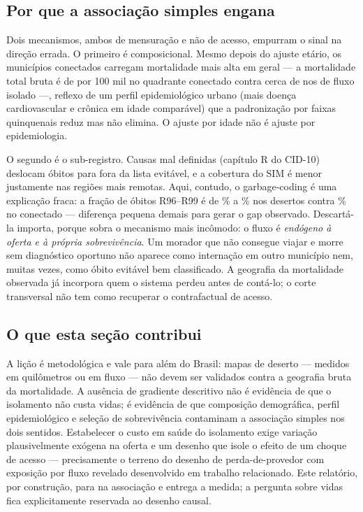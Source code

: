 \subsection{Por que a associação simples engana}

Dois mecanismos, ambos de mensuração e não de acesso, empurram o sinal na
direção errada. O primeiro é composicional. Mesmo depois do ajuste etário, os
municípios conectados carregam mortalidade mais alta em geral --- a mortalidade
total bruta é de \valMortTotNE{} por 100 mil no quadrante conectado contra cerca
de \valMortTotDes{} nos de fluxo isolado ---,%
reflexo de um perfil epidemiológico urbano (mais doença cardiovascular e
crônica em idade comparável) que a padronização por faixas quinquenais reduz mas
não elimina. O ajuste por idade não é ajuste por epidemiologia.

O segundo é o sub-registro. Causas mal definidas (capítulo R do CID-10)
deslocam óbitos para fora da lista evitável, e a cobertura do SIM é menor
justamente nas regiões mais remotas. Aqui, contudo, o garbage-coding é uma
explicação fraca: a fração de óbitos R96--R99 é de \valGarbageLo\% a \valGarbageHi\% nos desertos
contra \valGarbageNE\% no conectado --- diferença pequena demais para gerar o gap
observado.%
Descartá-la importa, porque sobra o mecanismo mais incômodo: o fluxo é
\emph{endógeno à oferta e à própria sobrevivência}. Um morador que não consegue
viajar e morre sem diagnóstico oportuno não aparece como internação em outro
município nem, muitas vezes, como óbito evitável bem classificado. A geografia
da mortalidade observada já incorpora quem o sistema perdeu antes de contá-lo; o
corte transversal não tem como recuperar o contrafactual de acesso.

\subsection{O que esta seção contribui}

A lição é metodológica e vale para além do Brasil: mapas de deserto ---
medidos em quilômetros ou em fluxo --- não devem ser validados contra a
geografia bruta da mortalidade. A ausência de gradiente descritivo não é
evidência de que o isolamento não custa vidas; é evidência de que composição
demográfica, perfil epidemiológico e seleção de sobrevivência contaminam a
associação simples nos dois sentidos. Estabelecer o custo em saúde do
isolamento exige variação plausivelmente exógena na oferta e um desenho que
isole o efeito de um choque de acesso --- precisamente o terreno do desenho de
perda-de-provedor com exposição por fluxo revelado desenvolvido em trabalho
relacionado. Este relatório, por construção, para na associação e entrega a
medida; a pergunta sobre vidas fica explicitamente reservada ao desenho causal.
